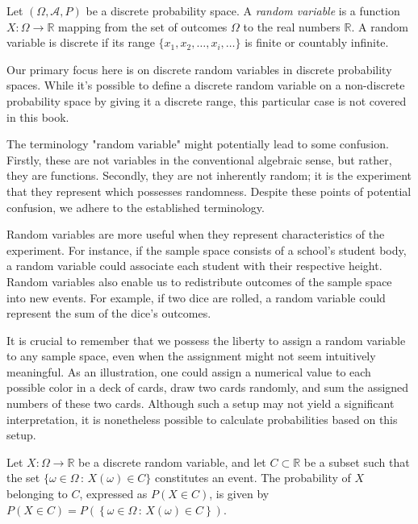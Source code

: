 \begin{definition}
Let $\left( \Omega, \mathcal{A} , P \right)$ be a discrete probability space. A \emph{random variable} is a function $X : \Omega \rightarrow \mathbb{R}$ mapping from the set of outcomes $\Omega$ to the real numbers $\mathbb{R}$. A random variable is discrete  if its range $\{ x_1, x_2, \ldots, x_i, \ldots \}$ is finite or countably infinite.
\end{definition}

Our primary focus here is on discrete random variables in discrete probability spaces. While it's possible to define a discrete random variable on a non-discrete probability space by giving it a discrete range, this particular case is not covered in this book.

The terminology "random variable" might potentially lead to some confusion. Firstly, these are not variables in the conventional algebraic sense, but rather, they are functions. Secondly, they are not inherently random; it is the experiment that they represent which possesses randomness. Despite these points of potential confusion, we adhere to the established terminology.

Random variables are more useful when they represent characteristics of the experiment. For instance, if the sample space consists of a school's student body, a random variable could associate each student with their respective height. Random variables also enable us to redistribute outcomes of the sample space into new events. For example, if two dice are rolled, a random variable could represent the sum of the dice's outcomes.

It is crucial to remember that we possess the liberty to assign a random variable to any sample space, even when the assignment might not seem intuitively meaningful. As an illustration, one could assign a numerical value to each possible color in a deck of cards, draw two cards randomly, and sum the assigned numbers of these two cards. Although such a setup may not yield a significant interpretation, it is nonetheless possible to calculate probabilities based on this setup.

\begin{definition}
Let $X : \Omega \rightarrow \mathbb{R}$ be a discrete random variable, and let $C \subset \mathbb{R}$ be a subset such that the set $\{ \omega \in \Omega \,:\, X \left( \omega \right) \in C\}$ constitutes an event. The probability of $X$ belonging to $C$, expressed as $P\left(X \in C \right)$, is given by $P\left( X \in C \right)=P \left( \left\{ \omega \in \Omega \,:\, X \left( \omega \right) \in C\right\} \right)$.
\end{definition}

